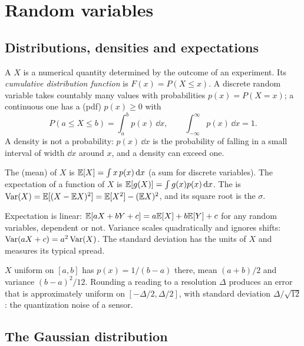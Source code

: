 \section{Random variables}

\subsection{Distributions, densities and expectations}

A  $X$ is a numerical quantity determined by the outcome of an experiment. Its \emph{cumulative distribution
function} is $F(x) = P(X \le x)$. A discrete random variable takes countably many values with probabilities $p(x) = P(X = x)$; a continuous
one has a  (pdf) $p(x) \ge 0$ with
\begin{equation}
  P(a \le X \le b) = \int_a^bp(x)\,\dd x, \qquad \int_{-\infty}^\infty p(x)\,\dd x = 1 .
\end{equation}
A density is not a probability: $p(x)\,\dd x$ is the probability of falling in a small interval of width $\dd x$ around $x$, and a density
can exceed one.

\begin{definition}
The  (mean) of $X$ is $\mathbb{E}[X] = \int x\,p(x)\,\mathrm{d} x$ (a sum for discrete variables). The expectation of a function of $X$ is
$\mathbb{E}[g(X)] = \int g(x)p(x)\,\mathrm{d} x$. The  is $\operatorname{Var}(X) = \mathbb{E}[(X - \mathbb{E} X)^2] = \mathbb{E}[X^2] - (\mathbb{E} X)^2$, and its square root is the
 $\sigma$.
\end{definition}

Expectation is linear: $\mathbb{E}[aX + bY + c] = a\mathbb{E}[X] + b\mathbb{E}[Y] + c$ for any random variables, dependent or not. Variance scales quadratically and
ignores shifts: $\operatorname{Var}(aX + c) = a^2\operatorname{Var}(X)$. The standard deviation has the units of $X$ and measures its typical spread.

\begin{example}
$X$ uniform on $[a, b]$ has $p(x) = 1/(b - a)$ there, mean $(a + b)/2$ and variance $(b - a)^2/12$. Rounding a reading to a resolution
$\Delta$ produces an error that is approximately uniform on $[-\Delta/2, \Delta/2]$, with standard deviation $\Delta/\sqrt{12}$: the
quantization noise of a sensor.
\end{example}

\subsection{The Gaussian distribution}


